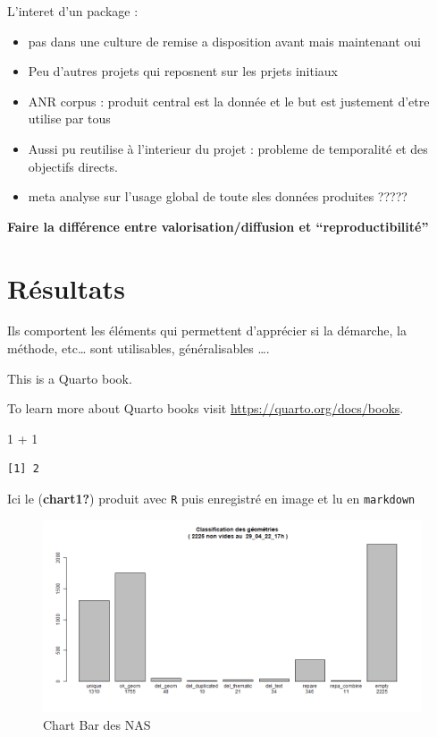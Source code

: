 \documentclass[
  12pt,
  a4paper,
]{scrbook}
\newenvironment{Shaded}{\begin{snugshade}}{\end{snugshade}}
\newcommand{\DecValTok}[1]{\textcolor[rgb]{0.16,0.63,0.60}{#1}}
\newcommand{\SpecialCharTok}[1]{\textcolor[rgb]{0.86,0.20,0.18}{#1}}
\providecommand{\tightlist}{%
  \setlength{\itemsep}{0pt}\setlength{\parskip}{0pt}}\usepackage{longtable,booktabs,array}
\begin{document}
L'interet d'un package :

\begin{itemize}
\tightlist
\item
  pas dans une culture de remise a disposition avant mais maintenant oui
\item
  Peu d'autres projets qui reposnent sur les prjets initiaux
\item
  ANR corpus : produit central est la donnée et le but est justement
  d'etre utilise par tous
\item
  Aussi pu reutilise à l'interieur du projet : probleme de temporalité
  et des objectifs directs.
\item
  meta analyse sur l'usage global de toute sles données produites ?????
\end{itemize}

\textbf{Faire la différence entre valorisation/diffusion et
``reproductibilité''}


\hypertarget{ruxe9sultats}{%
\chapter{Résultats}\label{ruxe9sultats}}

Ils comportent les éléments qui permettent d'apprécier si la démarche,
la méthode, etc\ldots{} sont utilisables, généralisables \ldots.

This is a Quarto book.

To learn more about Quarto books visit
\url{https://quarto.org/docs/books}.

\begin{Shaded}
\begin{Highlighting}[numbers=left,,]
\DecValTok{1} \SpecialCharTok{+} \DecValTok{1}
\end{Highlighting}
\end{Shaded}

\begin{verbatim}
[1] 2
\end{verbatim}

Ici le (\textbf{chart1?}) produit avec \texttt{R} puis enregistré en
image et lu en \texttt{markdown}

\begin{figure}

{\centering \includegraphics{./figures/bar_classify_Del_29_04_22_17h.png}

}

\caption{Chart Bar des NAS}

\end{figure}
\end{document}
